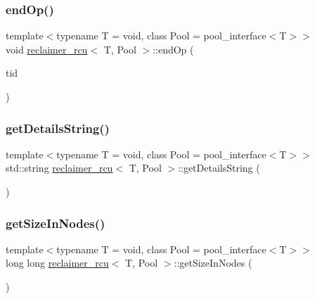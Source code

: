 \subsubsection{\texorpdfstring{end\+Op()}{endOp()}}
{\footnotesize\ttfamily template$<$typename T  = void, class Pool  = pool\+\_\+interface$<$\+T$>$$>$ \\
void \hyperlink{classreclaimer__rcu}{reclaimer\+\_\+rcu}$<$ T, Pool $>$\+::end\+Op (\begin{DoxyParamCaption}\item[{const int}]{tid }\end{DoxyParamCaption})\hspace{0.3cm}{\ttfamily [inline]}}

\mbox{\label{classreclaimer__rcu_a694c71982ebf65c7dab8c292cb8ee85d}} 
\subsubsection{\texorpdfstring{get\+Details\+String()}{getDetailsString()}}
{\footnotesize\ttfamily template$<$typename T  = void, class Pool  = pool\+\_\+interface$<$\+T$>$$>$ \\
std\+::string \hyperlink{classreclaimer__rcu}{reclaimer\+\_\+rcu}$<$ T, Pool $>$\+::get\+Details\+String (\begin{DoxyParamCaption}{ }\end{DoxyParamCaption})\hspace{0.3cm}{\ttfamily [inline]}}

\mbox{\label{classreclaimer__rcu_aef57d5f5142c6254fb451424db5db6e5}} 
\subsubsection{\texorpdfstring{get\+Size\+In\+Nodes()}{getSizeInNodes()}}
{\footnotesize\ttfamily template$<$typename T  = void, class Pool  = pool\+\_\+interface$<$\+T$>$$>$ \\
long long \hyperlink{classreclaimer__rcu}{reclaimer\+\_\+rcu}$<$ T, Pool $>$\+::get\+Size\+In\+Nodes (\begin{DoxyParamCaption}{ }\end{DoxyParamCaption})\hspace{0.3cm}{\ttfamily [inline]}}

